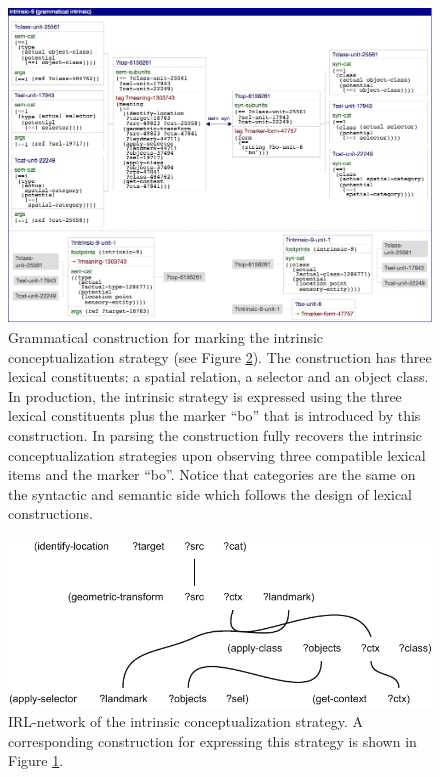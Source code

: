 \begin{figure}
\begin{center}
\includegraphics[width=0.98\columnwidth]{figs/bo-construction.png}
\end{center}
\caption[Example grammatical marker construction]{
Grammatical construction for marking the intrinsic conceptualization strategy
(see Figure \ref{f:semantic-structure-grammar-intrinsic}). The construction
has three lexical constituents: a spatial relation, a selector and an object class. In production,
the intrinsic strategy is expressed using the three lexical constituents plus the marker ``bo''
that is introduced by this construction. In parsing the construction fully recovers
the intrinsic conceptualization strategies upon observing three compatible lexical items 
and the marker ``bo''.
Notice that categories are the same on the syntactic and semantic side 
which follows the design of lexical constructions.}
\label{f:bo-construction}
\end{figure}

\begin{figure}
\begin{center}
\includegraphics[width=0.9\columnwidth]{figs/semantic-structure-intrinsic-strategy-grammatical-marking}
\end{center}
\caption[Semantic structure intrinsic conceptualization strategy]{IRL-network of the intrinsic conceptualization strategy. A corresponding construction
for expressing this strategy is shown in Figure \ref{f:bo-construction}.}
\label{f:semantic-structure-grammar-intrinsic}
\end{figure}


